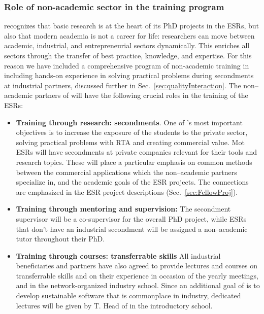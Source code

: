 \subsubsection{Role of non-academic sector in the training program}

\acronym recognizes that basic research is at the heart of its PhD projects in the ESRs, but also
that modern academia is not a career for life: researchers can move between academic, industrial,
and entrepreneurial sectors dynamically. This enriches all sectors through the transfer of best practice, knowledge, and expertise.
For this reason we have included a comprehensive program of non-academic training in \acronym 
including hands-on experience in solving practical problems during secondments
at industrial partners, discussed further in Sec.~\ref{sec:qualityInteraction}.
The non--academic partners of \acronym will have the following crucial roles in the training of the ESRs:
\begin{itemize}
\item \textbf{Training through research: secondments}. One of \acronym's most important objectives is to increase the exposure of the 
students to the private sector, solving practical problems with RTA and creating commercial value. 
Mot ESRs will have secondments at private companies relevant for their tools and research topics.
These will place a particular emphasis on common methods between the commercial
applications which the non--academic partners specialize in, and the academic goals of the ESR 
projects. The connections are emphasized in the ESR project descriptions (Sec.~\ref{sec:FellowProj}). 
\item \textbf{Training through mentoring and supervision:} The secondment supervisor will be a co-supervisor for the
overall PhD project, while ESRs that don't have an industrial secondment will be assigned a non--academic tutor throughout
their PhD.
\item \textbf{Training through courses: transferrable skills} All industrial beneficiaries and partners have also agreed to
provide lectures and courses on transferrable skills and on their experience in occasion of the yearly meetings, and in 
the network-organized industry school. Since an additional goal of \acronym is to develop sustainable software that is
commonplace in industry, dedicated lectures will be given by T. Head of \wildtreeentity in the introductory school.
\end{itemize}

